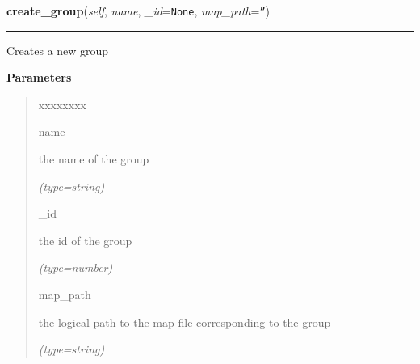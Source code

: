 \hspace{.8\funcindent}\begin{boxedminipage}{\funcwidth}

    \raggedright \textbf{create\_group}(\textit{self}, \textit{name}, \textit{\_id}={\tt None}, \textit{map\_path}={\tt ''})

    \vspace{-1.5ex}

    \rule{\textwidth}{0.5\fboxrule}
\setlength{\parskip}{2ex}
    Creates a new group

\setlength{\parskip}{1ex}
      \textbf{Parameters}
      \vspace{-1ex}

      \begin{quote}
        \begin{Ventry}{xxxxxxxx}

          \item[name]

          the name of the group

            {\it (type=string)}

          \item[\_id]

          the id of the group

            {\it (type=number)}

          \item[map\_path]

          the logical path to the map file corresponding to the group

            {\it (type=string)}

        \end{Ventry}

      \end{quote}

    \end{boxedminipage}

    \label{DBE:DBE:del_chip}

    \vspace{0.5ex}

